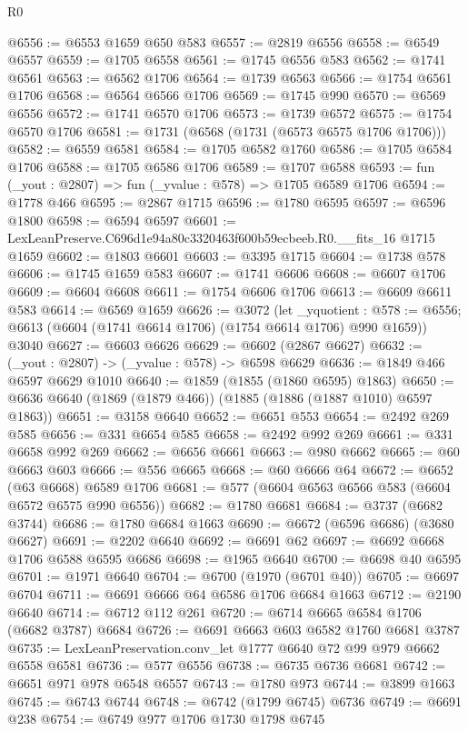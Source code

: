 \begin{lexlean}{R0}
\begin{coremodule}
@6556 := @6553 @1659 @650 @583
@6557 := @2819 @6556
@6558 := @6549 @6557
@6559 := @1705 @6558
@6561 := @1745 @6556 @583
@6562 := @1741 @6561
@6563 := @6562 @1706
@6564 := @1739 @6563
@6566 := @1754 @6561 @1706
@6568 := @6564 @6566 @1706
@6569 := @1745 @990
@6570 := @6569 @6556
@6572 := @1741 @6570 @1706
@6573 := @1739 @6572
@6575 := @1754 @6570 @1706
@6581 := @1731 (@6568 (@1731 (@6573 @6575 @1706 @1706)))
@6582 := @6559 @6581
@6584 := @1705 @6582 @1760
@6586 := @1705 @6584 @1706
@6588 := @1705 @6586 @1706
@6589 := @1707 @6588
@6593 := fun (_yout : @2807) => fun (_yvalue : @578) => @1705 @6589 @1706
@6594 := @1778 @466
@6595 := @2867 @1715
@6596 := @1780 @6595
@6597 := @6596 @1800
@6598 := @6594 @6597
@6601 := LexLeanPreserve.C696d1e94a80c3320463f600b59ecbeeb.R0.__fits_16 @1715 @1659
@6602 := @1803 @6601
@6603 := @3395 @1715
@6604 := @1738 @578
@6606 := @1745 @1659 @583
@6607 := @1741 @6606
@6608 := @6607 @1706
@6609 := @6604 @6608
@6611 := @1754 @6606 @1706
@6613 := @6609 @6611 @583
@6614 := @6569 @1659
@6626 := @3072
    (let _yquotient : @578 := @6556;
    @6613 (@6604 (@1741 @6614 @1706) (@1754 @6614 @1706) @990 @1659))
    @3040
@6627 := @6603 @6626
@6629 := @6602 (@2867 @6627)
@6632 := (_yout : @2807) -> (_yvalue : @578) -> @6598 @6629
@6636 := @1849 @466 @6597 @6629 @1010
@6640 := @1859 (@1855 (@1860 @6595) @1863)
@6650 := @6636 @6640 (@1869 (@1879 @466)) (@1885 (@1886 (@1887 @1010) @6597 @1863))
@6651 := @3158 @6640
@6652 := @6651 @553
@6654 := @2492 @269 @585
@6656 := @331 @6654 @585
@6658 := @2492 @992 @269
@6661 := @331 @6658 @992 @269
@6662 := @6656 @6661
@6663 := @980 @6662
@6665 := @60 @6663 @603
@6666 := @556 @6665
@6668 := @60 @6666 @64
@6672 := @6652 (@63 @6668) @6589 @1706
@6681 := @577 (@6604 @6563 @6566 @583 (@6604 @6572 @6575 @990 @6556))
@6682 := @1780 @6681
@6684 := @3737 (@6682 @3744)
@6686 := @1780 @6684 @1663
@6690 := @6672 (@6596 @6686) (@3680 @6627)
@6691 := @2202 @6640
@6692 := @6691 @62
@6697 := @6692 @6668 @1706 @6588 @6595 @6686
@6698 := @1965 @6640
@6700 := @6698 @40 @6595
@6701 := @1971 @6640
@6704 := @6700 (@1970 (@6701 @40))
@6705 := @6697 @6704
@6711 := @6691 @6666 @64 @6586 @1706 @6684 @1663
@6712 := @2190 @6640
@6714 := @6712 @112 @261
@6720 := @6714 @6665 @6584 @1706 (@6682 @3787) @6684
@6726 := @6691 @6663 @603 @6582 @1760 @6681 @3787
@6735 := LexLeanPreservation.conv_let @1777 @6640 @72 @99 @979 @6662 @6558 @6581
@6736 := @577 @6556
@6738 := @6735 @6736 @6681
@6742 := @6651 @971 @978 @6548 @6557
@6743 := @1780 @973
@6744 := @3899 @1663
@6745 := @6743 @6744
@6748 := @6742 (@1799 @6745) @6736
@6749 := @6691 @238
@6754 := @6749 @977 @1706 @1730 @1798 @6745

\end{coremodule}
\end{lexlean}

